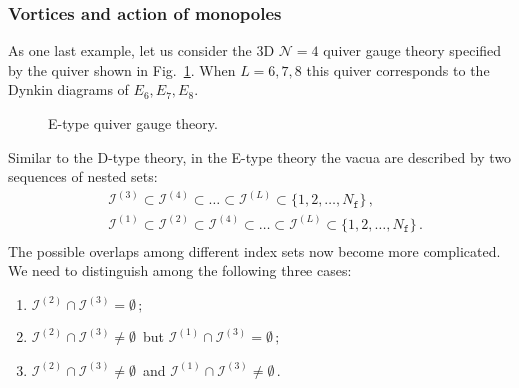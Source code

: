 \documentclass[12pt,a4paper]{article}
\renewcommand{\(}{\left(}
\renewcommand{\)}{\right)}
\renewcommand{\(}{\left(}
\renewcommand{\)}{\right)}
\begin{document}
\subsubsection{Vortices and action of monopoles}
As one last example, let us consider the 3D $\mathcal{N}=4$ quiver gauge theory specified by the quiver shown in Fig.~\ref{E_qui}. 
When $L=6,7,8$ this quiver corresponds to the Dynkin diagrams of $E_6,E_7,E_8$.
\begin{figure}[h]
\centering
{}
\caption{E-type quiver gauge theory.}
\label{E_qui}
\end{figure}

Similar to the D-type theory, in the E-type theory the vacua are described by two sequences of nested sets:
\begin{equation}
\begin{aligned}
&\mathcal{I}^{(3)}\subset\mathcal{I}^{(4)}\subset \dots\subset \mathcal{I}^{(L)}\subset\{1,2,\dots,N_{\mathtt{f}}\}\,,\\
&\mathcal{I}^{(1)}\subset\mathcal{I}^{(2)}\subset\mathcal{I}^{(4)}\subset \dots\subset \mathcal{I}^{(L)}\subset\{1,2,\dots,N_{\mathtt{f}}\}\,.\\
\end{aligned}
\end{equation}
The possible overlaps among different index sets now become more complicated. 
We need to distinguish among the following three cases:
\begin{enumerate}
\item $\mathcal{I}^{(2)}\cap\mathcal{I}^{(3)}=\emptyset\,;$
\item $\mathcal{I}^{(2)}\cap\mathcal{I}^{(3)}\neq\emptyset\,$ but $\mathcal{I}^{(1)}\cap\mathcal{I}^{(3)}=\emptyset\,;$
\item $\mathcal{I}^{(2)}\cap\mathcal{I}^{(3)}\neq\emptyset\,$ and $\mathcal{I}^{(1)}\cap\mathcal{I}^{(3)}\neq\emptyset\,$.
\end{enumerate}
\end{document}
